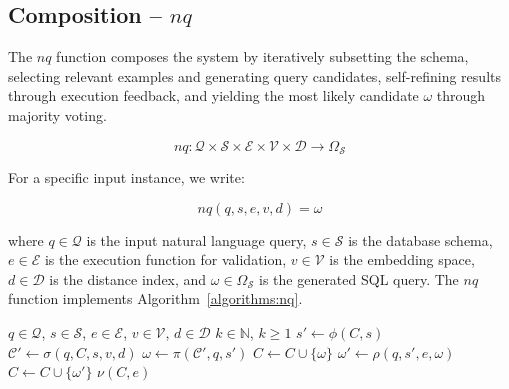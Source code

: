 \subsection{Composition – $nq$}

The $nq$ function composes the system by iteratively subsetting the schema,
selecting relevant examples and generating query candidates, self-refining
results through execution feedback, and yielding the most likely
candidate $\omega$ through majority voting.

$$
nq: \mathcal{Q} \times \mathcal{S} \times \mathcal{E} \times \mathcal{V} \times \mathcal{D} \rightarrow \Omega_{\mathcal{S}}
$$

\vspace{0.5em}

For a specific input instance, we write:

$$
nq(q, s, e, v, d) = \omega
$$

\vspace{0.5em}

where $q \in \mathcal{Q}$ is the input natural language query, $s \in \mathcal{S}$
is the database schema, $e \in \mathcal{E}$ is the execution function for validation,
$v \in \mathcal{V}$ is the embedding space, $d \in \mathcal{D}$ is the distance index,
and $\omega \in \Omega_{\mathcal{S}}$ is the generated SQL query. The $nq$
function implements Algorithm~\ref{algorithms:nq}.

\begin{algorithm}
\caption{$nq$ - Natural Query Pipeline}\label{algorithms:nq}
\begin{algorithmic}[1]
\Require $q \in \mathcal{Q}$, $s \in \mathcal{S}$, $e \in \mathcal{E}$, $v \in \mathcal{V}$, $d \in \mathcal{D}$
\Require $k \in \mathbb{N}$, $k \geq 1$             
                                   
    \State $s' \gets \phi(C, s)$                    
    \State $\mathcal{C}' \gets \sigma(q, C, s, v, d)$ 
    \State $\omega \gets \pi(\mathcal{C}', q, s')$  
                                
        \State $C \gets C \cup \{\omega\}$          
    \EndIf
    \State $\omega' \gets \rho(q, s', e, \omega)$   
                               
        \State $C \gets C \cup \{\omega'\}$         
    \EndIf
\EndWhile
\State \Return $\nu(C, e)$                          
\end{algorithmic}
\end{algorithm}
